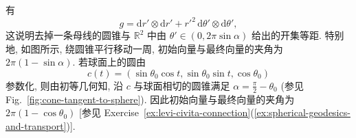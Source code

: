 \begin{description}[font=\normalfont,leftmargin=2em,labelwidth=1.5em]
\begin{enumerate}[label=(\alph*),ref=\alph*,leftmargin=*]
\[\]
有
\[
  g=\mathrm{d}r'\otimes\mathrm{d}r'+r'^2\,\mathrm{d}\theta'\otimes\mathrm{d}\theta',
\]
这说明去掉一条母线的圆锥与 $\mathbb{R}^2$ 中由 $\theta'\in(0,2\pi\sin\alpha)$ 给出的开集等距. 特别地, 如图所示, 绕圆锥平行移动一周, 初始向量与最终向量的夹角为 $2\pi(1-\sin\alpha)$. 若球面上的圆由
\[
  c(t)=(\sin\theta_0\cos t,\sin\theta_0\sin t,\cos\theta_0)
\]
参数化, 则由初等几何知, 沿 $c$ 与球面相切的圆锥满足 $\alpha=\frac{\pi}{2}-\theta_0$ (参见 Fig.~\ref{fig:cone-tangent-to-sphere}). 因此初始向量与最终向量的夹角为 $2\pi(1-\cos\theta_0)$ [参见 Exercise~\ref{ex:levi-civita-connection}(\ref{ex:spherical-geodesics-and-transport})].
\end{enumerate}
\end{description}
